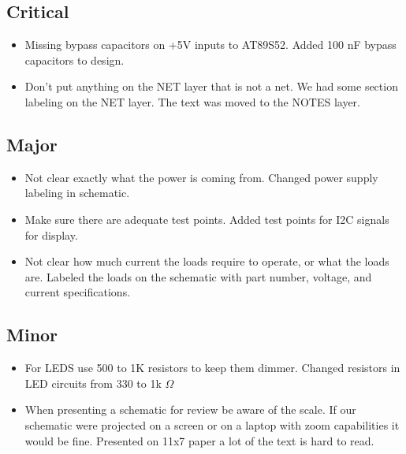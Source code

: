 \documentclass[11pt]{article}
\begin{document}
\subsection*{Critical}

\begin{itemize}

    \item Missing bypass capacitors on +5V inputs to AT89S52. Added 100 nF bypass capacitors to design.
    \item Don't put anything on the NET layer that is not a net. We had some section labeling on the NET layer. The text was moved to the NOTES layer.
    
\end{itemize}

\subsection*{Major}

\begin{itemize}

    \item Not clear exactly what the power is coming from. Changed power supply labeling in schematic.
    \item Make sure there are adequate test points. Added test points for I2C signals for display.
    \item Not clear how much current the loads require to operate, or what the loads are. Labeled the loads on the schematic with part number, voltage, and current specifications.

\end{itemize}
		
\subsection*{Minor}

\begin{itemize}

    \item For LEDS use 500 to 1K resistors to keep them dimmer. Changed resistors in LED circuits from 330 to 1k $\Omega$
    \item When presenting a schematic for review be aware of the scale. If our schematic were projected on a screen or on a laptop with zoom capabilities it would be fine. Presented on 11x7 paper a lot of the text is hard to read.

\end{itemize}
\end{document}

